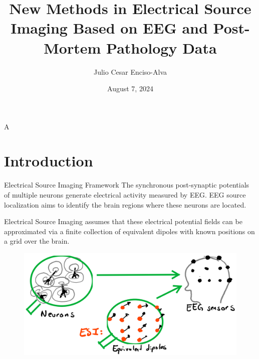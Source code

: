\documentclass[progressbar=head]{beamer}
\title{New Methods in Electrical Source Imaging Based on EEG and Post-Mortem Pathology Data}
\date{August 7, 2024}
\author{Julio Cesar Enciso-Alva}
\institute{University   of Texas at Arlington}
\begin{document}

{
\maketitle

\begin{frame}%
\tableofcontents
\end{frame}
}

\begin{frame}{A}

\end{frame}

{
\section{Introduction}
}

\begin{frame}{Electrical Source Imaging Framework}
    The synchronous post-synaptic potentials of multiple neurons generate electrical activity measured by EEG.
    EEG source localization aims to identify the brain regions where these neurons are located.
    
    Electrical Source Imaging assumes that 
    these electrical potential fields
    can be 
    approximated via a finite collection 
    of equivalent dipoles
    with known positions on a grid over the brain.

\begin{figure}
\centering
\includegraphics[width=0.6\linewidth]{./img_oldbeamer/sketch03}
\end{figure}
\end{frame}
\end{document}
